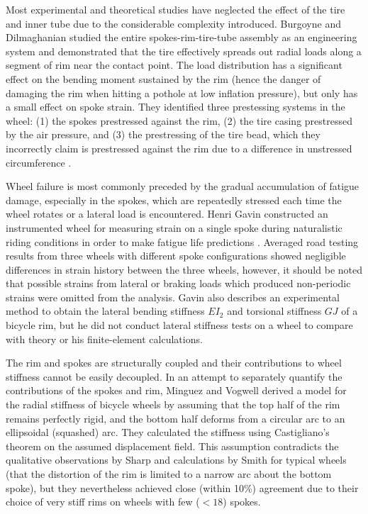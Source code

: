 \documentclass[../thesis.tex]{subfiles}
\begin{document}
Most experimental and theoretical studies have neglected the effect of the tire and inner tube due to the considerable complexity introduced. Burgoyne and Dilmaghanian \cite{Burgoyne1993} studied the entire spokes-rim-tire-tube assembly as an engineering system and demonstrated that the tire effectively spreads out radial loads along a segment of rim near the contact point. The load distribution has a significant effect on the bending moment sustained by the rim (hence the danger of damaging the rim when hitting a pothole at low inflation pressure), but only has a small effect on spoke strain. They identified three prestessing systems in the wheel: (1) the spokes prestressed against the rim, (2) the tire casing prestressed by the air pressure, and (3) the prestressing of the tire bead, which they incorrectly claim is prestressed against the rim due to a difference in unstressed circumference \cite{Papadopoulos1995}.

Wheel failure is most commonly preceded by the gradual accumulation of fatigue damage, especially in the spokes, which are repeatedly stressed each time the wheel rotates or a lateral load is encountered. Henri Gavin constructed an instrumented wheel for measuring strain on a single spoke during naturalistic riding conditions in order to make fatigue life predictions \cite{Gavin1996}. Averaged road testing results from three wheels with different spoke configurations showed negligible differences in strain history between the three wheels, however, it should be noted that possible strains from lateral or braking loads which produced non-periodic strains were omitted from the analysis. Gavin also describes an experimental method to obtain the lateral bending stiffness $EI_2$ and torsional stiffness $GJ$ of a bicycle rim, but he did not conduct lateral stiffness tests on a wheel to compare with theory or his finite-element calculations.

The rim and spokes are structurally coupled and their contributions to wheel stiffness cannot be easily decoupled. In an attempt to separately quantify the contributions of the spokes and rim, Minguez and Vogwell \cite{Minguez2008} derived a model for the radial stiffness of bicycle wheels by assuming that the top half of the rim remains perfectly rigid, and the bottom half deforms from a circular arc to an ellipsoidal (squashed) arc. They calculated the stiffness using Castigliano's theorem on the assumed displacement field. This assumption contradicts the qualitative observations by Sharp and calculations by Smith for typical wheels (that the distortion of the rim is limited to a narrow arc about the bottom spoke), but they nevertheless achieved close (within 10\%) agreement due to their choice of very stiff rims on wheels with few ($<18$) spokes.
\end{document}
